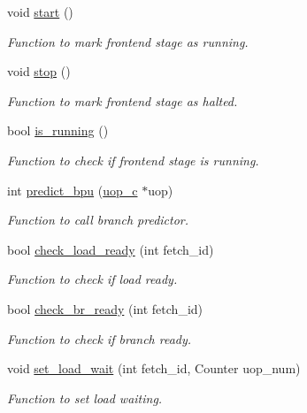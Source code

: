 \begin{DoxyCompactItemize}
void \hyperlink{classfrontend__c_a5f42b58999ffa5ac6341c9e0e9d55f94}{start} ()
\begin{DoxyCompactList}\small\item\em Function to mark frontend stage as running. \item\end{DoxyCompactList}\item 
void \hyperlink{classfrontend__c_a09e3aab7dbc42cc7276eae6d417634d4}{stop} ()
\begin{DoxyCompactList}\small\item\em Function to mark frontend stage as halted. \item\end{DoxyCompactList}\item 
bool \hyperlink{classfrontend__c_a804f8b3644f08dd719bb04a52ba7e058}{is\_\-running} ()
\begin{DoxyCompactList}\small\item\em Function to check if frontend stage is running. \item\end{DoxyCompactList}\item 
int \hyperlink{classfrontend__c_a6f6a017f1f666c0f6e9b58b435bb1c4c}{predict\_\-bpu} (\hyperlink{classuop__c}{uop\_\-c} $\ast$uop)
\begin{DoxyCompactList}\small\item\em Function to call branch predictor. \item\end{DoxyCompactList}\item 
bool \hyperlink{classfrontend__c_a57a6d06b4c32abdda2d45c0b428d2055}{check\_\-load\_\-ready} (int fetch\_\-id)
\begin{DoxyCompactList}\small\item\em Function to check if load ready. \item\end{DoxyCompactList}\item 
bool \hyperlink{classfrontend__c_ab2278ac8cdb4981dfe643832712fde0d}{check\_\-br\_\-ready} (int fetch\_\-id)
\begin{DoxyCompactList}\small\item\em Function to check if branch ready. \item\end{DoxyCompactList}\item 
void \hyperlink{classfrontend__c_a1d26468325310f26f517cea820f5f81d}{set\_\-load\_\-wait} (int fetch\_\-id, Counter uop\_\-num)
\begin{DoxyCompactList}\small\item\em Function to set load waiting. \item\end{DoxyCompactList}\item 

\end{DoxyCompactItemize}
